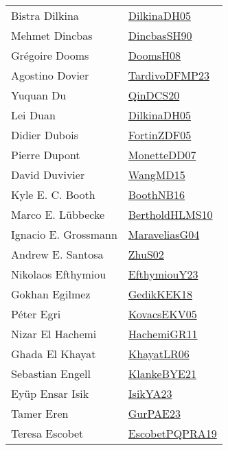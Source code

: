 {\begin{longtable}{p{4cm}p{20cm}}
Bistra Dilkina & \href{papers/DilkinaDH05.pdf}{DilkinaDH05}\cite{DilkinaDH05} \\
Mehmet Dincbas & \href{articles/DincbasSH90.pdf}{DincbasSH90}\cite{DincbasSH90} \\
Gr{\'{e}}goire Dooms & \href{papers/DoomsH08.pdf}{DoomsH08}\cite{DoomsH08} \\
Agostino Dovier & \href{papers/TardivoDFMP23.pdf}{TardivoDFMP23}\cite{TardivoDFMP23} \\
Yuquan Du & \href{articles/QinDCS20.pdf}{QinDCS20}\cite{QinDCS20} \\
Lei Duan & \href{papers/DilkinaDH05.pdf}{DilkinaDH05}\cite{DilkinaDH05} \\
Didier Dubois & \href{papers/FortinZDF05.pdf}{FortinZDF05}\cite{FortinZDF05} \\
Pierre Dupont & \href{papers/MonetteDD07.pdf}{MonetteDD07}\cite{MonetteDD07} \\
David Duvivier & \href{articles/WangMD15.pdf}{WangMD15}\cite{WangMD15} \\
Kyle E. C. Booth & \href{papers/BoothNB16.pdf}{BoothNB16}\cite{BoothNB16} \\
Marco E. L{\"{u}}bbecke & \href{papers/BertholdHLMS10.pdf}{BertholdHLMS10}\cite{BertholdHLMS10} \\
Ignacio E. Grossmann & \href{papers/MaraveliasG04.pdf}{MaraveliasG04}\cite{MaraveliasG04} \\
Andrew E. Santosa & \href{papers/ZhuS02.pdf}{ZhuS02}\cite{ZhuS02} \\
Nikolaos Efthymiou & \href{papers/EfthymiouY23.pdf}{EfthymiouY23}\cite{EfthymiouY23} \\
Gokhan Egilmez & \href{articles/GedikKEK18.pdf}{GedikKEK18}\cite{GedikKEK18} \\
P{\'{e}}ter Egri & \href{papers/KovacsEKV05.pdf}{KovacsEKV05}\cite{KovacsEKV05} \\
Nizar El Hachemi & \href{articles/HachemiGR11.pdf}{HachemiGR11}\cite{HachemiGR11} \\
Ghada El Khayat & \href{articles/KhayatLR06.pdf}{KhayatLR06}\cite{KhayatLR06} \\
Sebastian Engell & \href{papers/KlankeBYE21.pdf}{KlankeBYE21}\cite{KlankeBYE21} \\
Ey{\"{u}}p Ensar Isik & \href{articles/IsikYA23.pdf}{IsikYA23}\cite{IsikYA23} \\
Tamer Eren & \href{articles/GurPAE23.pdf}{GurPAE23}\cite{GurPAE23} \\
Teresa Escobet & \href{articles/EscobetPQPRA19.pdf}{EscobetPQPRA19}\cite{EscobetPQPRA19} \\

\end{longtable}}
